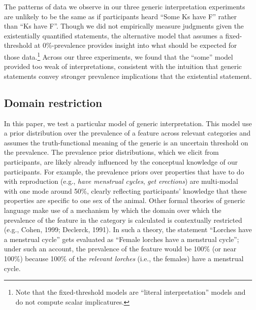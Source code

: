 \documentclass[floatsintext,man]{apa6}
\theoremstyle{definition}
\theoremstyle{definition}
\theoremstyle{definition}
\theoremstyle{remark}
\begin{document}
The patterns of data we observe in our three generic interpretation
experiments are unlikely to be the same as if participants heard
\enquote{Some Ks have F} rather than \enquote{Ks have F}. Though we did
not empirically measure judgments given the existentially quantified
statements, the alternative model that assumes a fixed-threshold at
0\%-prevalence provides insight into what should be expected for those
data.\footnote{Note that the fixed-threshold models are \enquote{literal
  interpretation} models and do not compute scalar implicatures.} Across
our three experiments, we found that the \enquote{some} model provided
too weak of interpretations, consistent with the intuition that generic
statements convey stronger prevalence implications that the existential
statement.


\subsection{Domain restriction}\label{domain-restriction}

In this paper, we test a particular model of generic interpretation.
This model use a prior distribution over the prevalence of a feature
across relevant categories and assumes the truth-functional meaning of
the generic is an uncertain threshold on the prevalence. The prevalence
prior distributions, which we elicit from participants, are likely
already influenced by the conceptual knowledge of our participants. For
example, the prevalence priors over properties that have to do with
reproduction (e.g., \emph{have menstrual cycles}, \emph{get erections})
are multi-modal with one mode around 50\%, clearly reflecting
participants' knowledge that these properties are specific to one sex of
the animal. Other formal theories of generic language make use of a
mechanism by which the domain over which the prevalence of the feature
in the category is calculated is contextually restricted (e.g., Cohen,
1999; Declerck, 1991). In such a theory, the statement \enquote{Lorches
have a menstrual cycle} gets evaluated as \enquote{Female lorches have a
menstrual cycle}; under such an account, the prevalence of the feature
would be 100\% (or near 100\%) because 100\% of the \emph{relevant
lorches} (i.e., the females) have a menstrual cycle.
\end{document}
